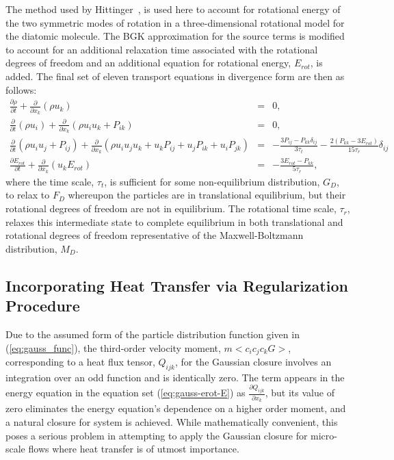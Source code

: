 \documentclass[titlepage,11pt,letterpaper]{article}
\begin{document}
The method used by Hittinger~\cite{hittinger:2000}, is used here to account for rotational 
energy of the two symmetric modes of rotation in a three-dimensional rotational model for 
the diatomic molecule. The BGK approximation for the source terms is modified to account for 
an additional relaxation time associated with the rotational degrees of freedom and an 
additional equation for rotational energy, $E_{rot}$, is added. The final set of eleven 
transport equations in divergence form are then as follows:
%
\begin{eqnarray}\label{eq:gauss-erot}
\frac{\partial \rho}{\partial t} + \frac{\partial}{\partial x_{k}}(\rho u_{k}) &=& 0, \\
 \frac{\partial}{\partial t}(\rho u_{i}) + \frac{\partial}{\partial x_{k}}(\rho u_{i} u_{k}+P_{ik}) &=& 0, \\
 \frac{\partial}{\partial t}(\rho u_i u_j + P_{ij}) + 
\label{eq:gauss-erot-E} \frac{\partial}{\partial x_{k}}(\rho u_i u_j u_k + u_k P_{ij} + u_j P_{ik} + u_i P_{jk})
&=& -\frac{3P_{ij}-P_{kk} \delta_{ij}}{3 \tau_t} -\frac{2\left (P_{kk}-3E_{rot} \right )}{15 \tau_r}\delta_{ij}\\
\frac{\partial E_{rot}}{\partial t} + \frac{\partial}{\partial x_{k}}(u_{k} E_{rot})
&=& -\frac{3E_{rot}-P_{kk}}{5 \tau_{r}},
\end{eqnarray}
%
where the time scale, $\tau_t$, is sufficient for some non-equilibrium distribution, 
$G_D$, to relax to $F_D$ whereupon the particles are in translational equilibrium, but their 
rotational degrees of freedom are not in equilibrium. The rotational time scale, $\tau_r$, 
relaxes this intermediate state to complete equilibrium in both translational and rotational 
degrees of freedom representative of the Maxwell-Boltzmann distribution, $M_D$. 

\subsection{Incorporating Heat Transfer via Regularization Procedure}
Due to the assumed form of the particle distribution function given in 
(\ref{eq:gauss_func}), the third-order velocity moment, $m<c_ic_jc_kG>$, corresponding to a 
heat flux tensor, $Q_{ijk}$, for the Gaussian closure involves an integration over an odd 
function and is identically zero. The term appears in the energy equation in the equation 
set (\ref{eq:gauss-erot-E}) as $\frac{\partial Q_{ijk}}{\partial x_k}$, but its value of zero 
eliminates the energy equation's dependence on a higher order moment, and a natural closure 
for system is achieved. While mathematically convenient, this poses a serious problem in 
attempting to apply the Gaussian closure for micro-scale flows where heat transfer is of 
utmost importance. 
\end{document}

